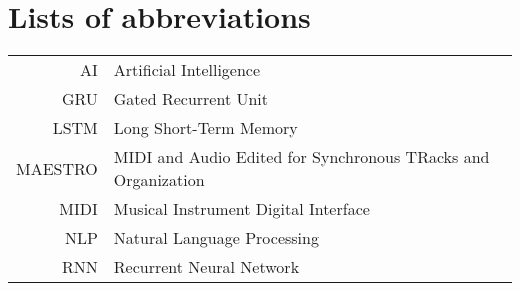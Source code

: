 \documentclass[english,bachelor,unicode]{ctufit-thesis}
\theoremstyle{plain}
\theoremstyle{definition}
\theoremstyle{remark}
\numberwithin{theorem}{chapter}
\begin{document}
    \printabstractpage %

%
%
%
%
%
%
%
%
%



    \chapter{Lists of abbreviations}\label{ch:lists-of-abbreviations}

    \begin{tabular}{rl}
        AI      & Artificial Intelligence                                       \\
        GRU     & Gated Recurrent Unit                                          \\
        LSTM    & Long Short-Term Memory                                        \\
        MAESTRO & MIDI and Audio Edited for Synchronous TRacks and Organization \\
        MIDI    & Musical Instrument Digital Interface                          \\
        NLP     & Natural Language Processing                                   \\
        RNN     & Recurrent Neural Network
    \end{tabular}
\end{document}
